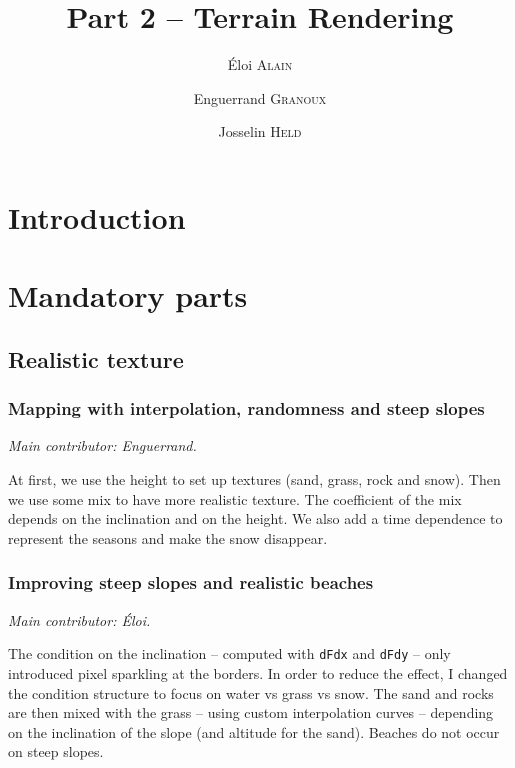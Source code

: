 \documentclass[12pt]{article}
\begin{document}
\title{Part 2 -- Terrain Rendering}
\author{Éloi \textsc{Alain} \and Enguerrand \textsc{Granoux} \and Josselin \textsc{Held}}
\date{}

\maketitle

\tableofcontents

\section{Introduction}



\section{Mandatory parts}

\subsection{Realistic texture}

\subsubsection{Mapping with interpolation, randomness and steep slopes}

{\it Main contributor: Enguerrand.}

At first, we use the height to set up textures (sand, grass, rock and snow). Then we use some mix to have more realistic texture. The coefficient of the mix depends on the inclination and on the height. We also add a time dependence to represent the seasons and make the snow disappear.

\subsubsection{Improving steep slopes and realistic beaches}

{\it Main contributor: Éloi.}

The condition on the inclination -- computed with \texttt{dFdx} and \texttt{dFdy} -- only introduced pixel sparkling at the borders. In order to reduce the effect, I changed the condition structure to focus on water vs grass vs snow. The sand and rocks are then mixed with the grass -- using custom interpolation curves -- depending on the inclination of the slope (and altitude for the sand). Beaches do not occur on steep slopes.
  
\end{document}
